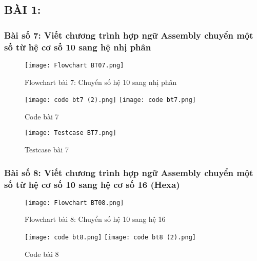 \subsection*{\textbf{\Large BÀI 1: }}

\subsubsection*{Bài số 7: Viết chương trình hợp ngữ Assembly chuyển một số từ hệ cơ số 10 sang hệ nhị phân}

\begin{figure}[H]
    \centering
    \texttt{[image: Flowchart BT07.png]}
    \caption{Flowchart bài 7: Chuyển số hệ 10 sang nhị phân}
    \label{fig:flowchart_bt7}
\end{figure}

\begin{figure}[H]
    \centering
    \texttt{[image: code bt7 (2).png]}
    \texttt{[image: code bt7.png]}
    \caption{Code bài 7}
    \label{fig:code_bt7}
\end{figure}

\begin{figure}[H]
    \centering
    \texttt{[image: Testcase BT7.png]}
    \caption{Testcase bài 7}
    \label{fig:testcase_bt7}
\end{figure}


\subsubsection*{Bài số 8: Viết chương trình hợp ngữ Assembly chuyển một số từ hệ cơ số 10 sang hệ cơ số 16 (Hexa)}

\begin{figure}[H]
    \centering
    \texttt{[image: Flowchart BT08.png]}
    \caption{Flowchart bài 8: Chuyển số hệ 10 sang hệ 16}
    \label{fig:flowchart_bt8}
\end{figure}

\begin{figure}[H]
    \centering
    \texttt{[image: code bt8.png]}
    \texttt{[image: code bt8 (2).png]}
    \caption{Code bài 8}
    \label{fig:code_bt8}
\end{figure}


